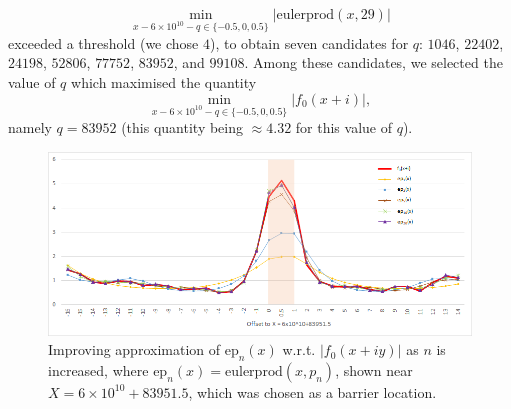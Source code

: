 $$ \min_{x - 6 \times 10^{10} - q \in \{-0.5,0,0.5\}} |\mathrm{eulerprod}(x,29)|$$
exceeded a threshold (we chose $4$), to obtain seven candidates for $q$: $1046$, $22402$, $24198$, $52806$, $77752$, $83952$, and $99108$.  Among these candidates, we selected the value of $q$ which maximised the quantity
$$ \min_{x - 6 \times 10^{10} - q \in \{-0.5,0,0.5\}} |f_0(x+i)|,$$
namely $q = 83952$ (this quantity being $\approx 4.32$ for this value of $q$).
\begin{figure}[ht!]
  \includegraphics[width=\linewidth]{euler_product_approximation.png}
  \caption{Improving approximation of $\mathrm{ep}_n(x)$ w.r.t. $|f_0(x+iy)|$ as $n$ is increased, where $\mathrm{ep}_n(x)=\mathrm{eulerprod}(x,p_n)$, shown near $X=6 \times 10^{10} + 83951.5$, which was chosen as a barrier location.}
	\label{euler}
\end{figure}


